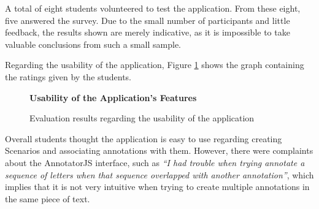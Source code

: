 \documentclass[conference]{IEEEtran}
\begin{document}
A total of eight students volunteered to test the application. From these eight, five answered the survey. Due to the small number of participants and little feedback, the results shown are merely indicative, as it is impossible to take valuable conclusions from such a small sample.

Regarding the usability of the application, Figure \ref{figure:usabilityEvaluation} shows the graph containing the ratings given by the students.

\begin{figure}[h]
\centering
\begin{normalsize}
\textbf{Usability of the Application's Features}\\
\end{normalsize}
\scriptsize
{}
\caption{Evaluation results regarding the usability of the application}
\label{figure:usabilityEvaluation}
\end{figure}

Overall students thought the application is easy to use regarding creating Scenarios and associating annotations with them. However, there were complaints about the AnnotatorJS interface, such as \textit{``I had trouble when trying annotate a sequence of letters when that sequence overlapped with another annotation''}, which implies that it is not very intuitive when trying to create multiple annotations in the same piece of text.
\end{document}
